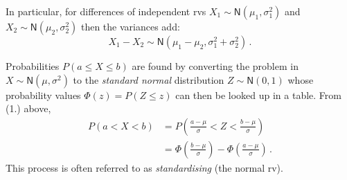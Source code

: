 \documentclass[
  a4paper,
  DIV=11,
  numbers=noendperiod,
  oneside]{scrreprt}
\theoremstyle{definition}
\theoremstyle{definition}
\theoremstyle{plain}
\theoremstyle{plain}
\theoremstyle{definition}
\theoremstyle{remark}
\begin{document}
\begin{tcolorbox}[enhanced jigsaw, toptitle=1mm, colback=white, left=2mm, arc=.35mm, breakable, colframe=quarto-callout-warning-color-frame, titlerule=0mm, coltitle=black, leftrule=.75mm, title=\textcolor{quarto-callout-warning-color}{\faExclamationTriangle}\hspace{0.5em}{Variances add}, opacitybacktitle=0.6, bottomtitle=1mm, colbacktitle=quarto-callout-warning-color!10!white, opacityback=0, rightrule=.15mm, bottomrule=.15mm, toprule=.15mm]

In particular, for differences of independent rvs
\(X_1 \sim \mathsf{N}(\mu_1, \sigma_1^2)\) and
\(X_2 \sim \mathsf{N}(\mu_2, \sigma_2^2)\) then the variances add:
\[ X_1 - X_2 \sim \mathsf{N}(\mu_1 - \mu_2, \sigma_1^2 + \sigma_2^2) \,.\]

\end{tcolorbox}

Probabilities \(P(a \leq X \leq b)\) are found by converting the problem
in \(X \sim \mathsf{N}(\mu, \sigma^2)\) to the \emph{standard normal}
distribution \(Z \sim \mathsf{N}(0, 1)\) whose probability values
\(\Phi(z) = P(Z\leq z)\) can then be looked up in a table. From (1.)
above, \[
\begin{aligned}
   P(a < X < b) &= P\left( \frac{a-\mu}{\sigma} < Z < \frac{b-\mu}{\sigma} \right) \\ 
    &= \Phi \left( \frac{b-\mu}{\sigma}\right) - \Phi\left(\frac{a-\mu}{\sigma}\right) \,.
\end{aligned}
\] This process is often referred to as \emph{standardising} (the normal
rv).
\end{document}

